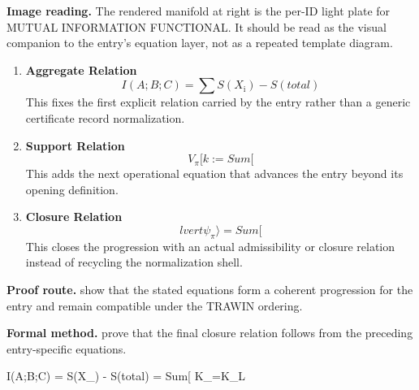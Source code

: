 \begin{samepage}
\noindent\begin{minipage}[t]{0.45\linewidth}
\vspace{0pt}
\raggedright
\scriptsize\textbf{Image reading.} The rendered manifold at right is the per-ID light plate for MUTUAL INFORMATION FUNCTIONAL. It should be read as the visual companion to the entry's equation layer, not as a repeated template diagram.\par
\end{minipage}\hfill
\begin{minipage}[t]{0.53\linewidth}
\vspace*{-0.10in}
\raggedright
{}
\end{minipage}
\end{samepage}

\clearpage


\begin{enumerate}[leftmargin=1.6em,itemsep=9pt,topsep=6pt]
\item \textbf{Aggregate Relation}
\[
I(A;B;C) = \sum S(X_{\mathrm{i}}) - S(total)
\]
This fixes the first explicit relation carried by the entry rather than a generic certificate record normalization.

\item \textbf{Support Relation}
\[
V_\pi[k := Sum[
\]
This adds the next operational equation that advances the entry beyond its opening definition.

\item \textbf{Closure Relation}
\[
lvert \psi_\pi \rangle = Sum[
\]
This closes the progression with an actual admissibility or closure relation instead of recycling the normalization shell.
\end{enumerate}

\textbf{Proof route.} show that the stated equations form a coherent progression for the entry and remain compatible under the TRAWIN ordering.

\textbf{Formal method.} prove that the final closure relation follows from the preceding entry-specific equations.

\medskip
{}

\begin{tzpsnapshot}
\end{tzpsnapshot}

\tzpequationlinks
  {I(A;B;C) = \sum S(X_{}) - S(total)}
  {= Sum[}
  {K_{}=K_{L}}
